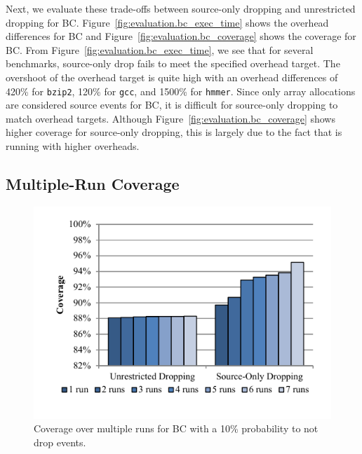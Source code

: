 Next, we evaluate these trade-offs between source-only dropping and unrestricted dropping for BC.
Figure~\ref{fig:evaluation.bc_exec_time} shows the overhead differences for BC
and Figure~\ref{fig:evaluation.bc_coverage} shows the coverage for BC.
From Figure~\ref{fig:evaluation.bc_exec_time}, we see that for several
benchmarks, source-only drop fails to meet the specified overhead target.
The overshoot of the overhead target is quite high with an overhead differences
of 420\% for {\tt bzip2}, 120\% for {\tt gcc}, and 1500\% for {\tt hmmer}.
Since only array allocations are considered source events for BC, it is
difficult for source-only dropping to match overhead targets. Although
Figure~\ref{fig:evaluation.bc_coverage} shows higher coverage for
source-only dropping, this is largely due to the fact that is running with
higher overheads.

\subsection{Multiple-Run Coverage}

\begin{figure}
  \begin{center}
    \includegraphics[width=\columnwidth]{figs/data_multirun_coverage.pdf}
    \vspace{-0.2in}
    \caption{Coverage over multiple runs for BC with a 10\% probability to not drop events.}
    \label{fig:evaluation.multirun}
    \vspace{-0.1in}
  \end{center}
\end{figure}

